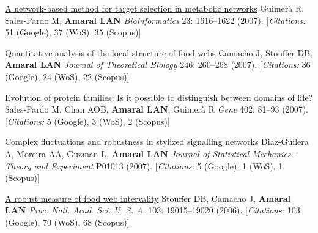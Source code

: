 \NumberedItem{\makebox[0.8cm][r]{[70]}}
\href{/people/amaral/a-network-based-method-for-target-selection-in-metabolic-networks}
{A network-based method for target selection in metabolic networks}
\newline
Guimer\`a R, Sales-Pardo M, {\textbf{Amaral LAN}}
\newline
\textit{Bioinformatics}
    23:
1616--1622 (2007).
    [{\em{Citations:}} 51 (Google), 37 (WoS), 35 (Scopus)]
\newline
\Gap
~
\Gap

\NumberedItem{\makebox[0.8cm][r]{[69]}}
\href{/people/amaral/quantitative-analysis-of-the-local-structure-of-food-webs}
{Quantitative analysis of the local structure of food webs}
\newline
Camacho J, Stouffer DB, {\textbf{Amaral LAN}}
\newline
\textit{Journal of Theoretical Biology}
    246:
260--268 (2007).
    [{\em{Citations:}} 36 (Google), 24 (WoS), 22 (Scopus)]
\newline
\Gap
~
\Gap

\NumberedItem{\makebox[0.8cm][r]{[68]}}
\href{/people/amaral/evolution-of-protein-families-is-it-possible-to-distinguish-between-domains-of-life}
{Evolution of protein families: Is it possible to distinguish between domains of life?}
\newline
Sales-Pardo M, Chan AOB, {\textbf{Amaral LAN}}, Guimer\`a R
\newline
\textit{Gene}
    402:
81--93 (2007).
    [{\em{Citations:}} 5 (Google), 3 (WoS), 2 (Scopus)]
\newline
\Gap
~
\Gap

\NumberedItem{\makebox[0.8cm][r]{[67]}}
\href{/people/amaral/complex-fluctuations-and-robustness-in-stylized-signalling-networks}
{Complex fluctuations and robustness in stylized signalling networks}
\newline
Diaz-Guilera A, Moreira AA, Guzman L, {\textbf{Amaral LAN}}
\newline
\textit{Journal of Statistical Mechanics - Theory and Experiment}
P01013 (2007).
    [{\em{Citations:}} 5 (Google), 1 (WoS), 1 (Scopus)]
\newline
\Gap
~
\Gap

\NumberedItem{\makebox[0.8cm][r]{[66]}}
\href{/people/amaral/a-robust-measure-of-food-web-intervality}
{A robust measure of food web intervality}
\newline
Stouffer DB, Camacho J, {\textbf{Amaral LAN}}
\newline
\textit{Proc. Natl. Acad. Sci. U. S. A.}
    103:
19015--19020 (2006).
    [{\em{Citations:}} 103 (Google), 70 (WoS), 68 (Scopus)]
\newline
\Gap
~
\Gap

